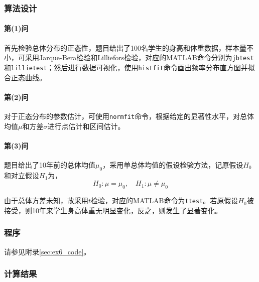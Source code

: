 
\subsubsection{算法设计}

\paragraph{第(1)问} 首先检验总体分布的正态性，题目给出了100名学生的身高和体重数据，样本量不小，可采用Jarque-Bera检验和Lilliefors检验，对应的MATLAB命令分别为\texttt{jbtest}和\texttt{lillietest}；然后进行数据可视化，使用\texttt{histfit}命令画出频率分布直方图并拟合正态曲线。

\paragraph{第(2)问} 对于正态分布的参数估计，可使用\texttt{normfit}命令，根据给定的显著性水平，对总体均值$\mu$和方差$\sigma$进行点估计和区间估计。

\paragraph{第(3)问} 题目给出了10年前的总体均值$\mu_0$，采用单总体均值的假设检验方法，记原假设$H_0$和对立假设$H_1$为，
\begin{equation}
    H_0: \mu = \mu_0, \quad H_1: \mu \ne \mu_0
\end{equation}

由于总体方差未知，故采用$t$检验，对应的MATLAB命令为\texttt{ttest}。若原假设$H_0$被接受，则10年来学生身高体重无明显变化，反之，则发生了显著变化。

\subsubsection{程序}

请参见附录\ref{sec:ex6_code}。

\subsubsection{计算结果}

